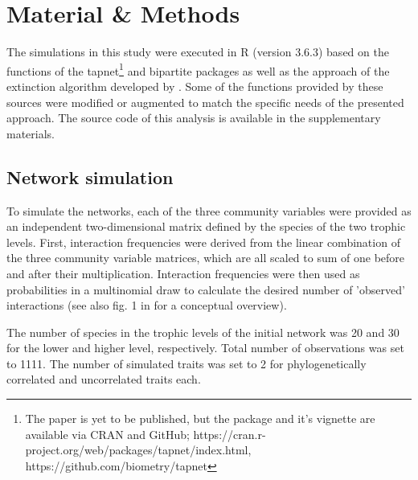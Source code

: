 \documentclass[12pt,a4paper]{article}
\begin{document}
	\section{Material \& Methods}
	The simulations in this study were executed in R \parencite{Rcore} (version 3.6.3) based on the functions of the tapnet\footnote{The paper is yet to be published, but the package and it's vignette are available via CRAN and GitHub; https://cran.r-project.org/web/packages/tapnet/index.html, https://github.com/biometry/tapnet} \parencite{Benadi} and bipartite \parencite{Dormann2008} packages as well as the approach of the extinction algorithm developed by \citeauthor{Vizentin-Bugoni2019} \parencite{Vizentin-Bugoni2019}. Some of the functions provided by these sources were modified or augmented to match the specific needs of the presented approach. The source code of this analysis is available in the supplementary materials. \par



	\subsection{Network simulation} \label{sec:net_sim}
	To simulate the networks, each of the three community variables were provided as an independent two-dimensional matrix defined by the species of the two trophic levels. First, interaction frequencies were derived from the linear combination of the three community variable matrices, which are all scaled to sum of one before and after their multiplication. Interaction frequencies were then used as probabilities in a multinomial draw to calculate the desired number of 'observed' interactions (see also fig. 1 in \cite{Benadi} for a conceptual overview). \par

	
	The number of species in the trophic levels of the initial network was 20 and 30 for the lower and higher level, respectively. Total number of observations was set to 1111. The number of simulated traits was set to 2 for phylogenetically correlated and uncorrelated traits each.
	
\end{document}
